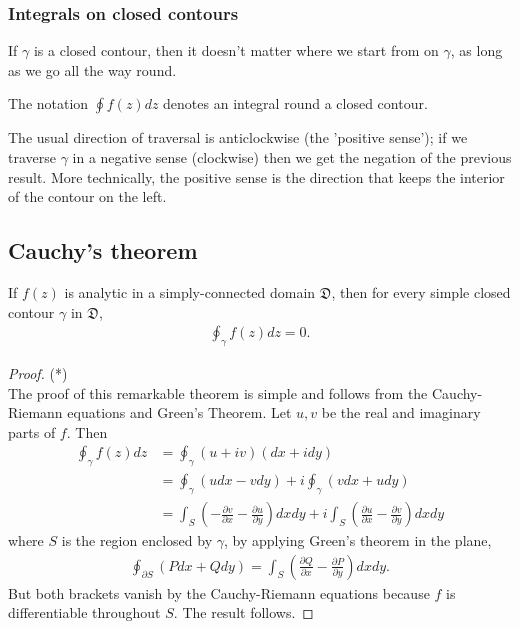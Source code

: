 \documentclass[a4paper]{article}
\begin{document}
\subsubsection{Integrals on closed contours}
If $\gamma$ is a closed contour, then it doesn't matter where we start from on $\gamma$, as long as we go all the way round.

The notation $\oint f(z) dz$ denotes an integral round a closed contour.

The usual direction of traversal is anticlockwise (the 'positive sense'); if we traverse $\gamma$ in a negative sense (clockwise) then we get the negation of the previous result. More technically, the positive sense is the direction that keeps the interior of the contour on the left.

\subsection{Cauchy's theorem}
If $f(z)$ is analytic in a simply-connected domain $\mathfrak{D}$, then for every simple closed contour $\gamma$ in $\mathfrak{D}$,
\begin{equation*}
\begin{aligned}
\oint_\gamma f(z) dz = 0.
\end{aligned}
\end{equation*}
\begin{proof}(*)\\
The proof of this remarkable theorem is simple and follows from the Cauchy-Riemann equations and Green's Theorem. Let $u,v$ be the real and imaginary parts of $f$. Then
\begin{equation*}
\begin{aligned}
\oint_\gamma f(z) dz &= \oint_\gamma (u+iv)(dx+idy)\\
&= \oint_\gamma (udx - vdy) + i\oint_\gamma (vdx + udy)\\
&= \int_S \left(-\frac{\partial v}{\partial x} - \frac{\partial u}{\partial y}\right) dxdy + i\int_S \left(\frac{\partial u}{\partial x} - \frac{\partial v}{\partial y}\right)dxdy
\end{aligned}
\end{equation*}
where $S$ is the region enclosed by $\gamma$, by applying Green's theorem in the plane,
\begin{equation*}
\begin{aligned}
\oint_{\partial S} (Pdx+Qdy) = \int_S \left(\frac{\partial Q}{\partial x} -\frac{\partial P}{\partial y}\right) dxdy.
\end{aligned}
\end{equation*}
But both brackets vanish by the Cauchy-Riemann equations because $f$ is differentiable throughout $S$. The result follows.
\end{proof}
\end{document}
